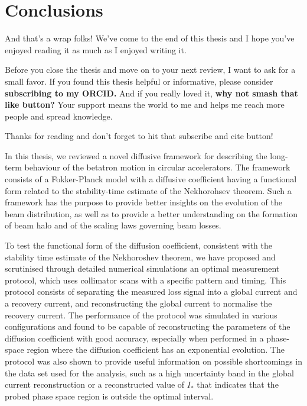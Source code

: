 \chapter*{Conclusions}

And that's a wrap folks! We've come to the end of this thesis and I hope you've enjoyed reading it as much as I enjoyed writing it.

Before you close the thesis and move on to your next review, I want to ask for a small favor. If you found this thesis helpful or informative, please consider \textbf{subscribing to my ORCID.} And if you really loved it, \textbf{why not smash that like button?} Your support means the world to me and helps me reach more people and spread knowledge.

Thanks for reading and don't forget to hit that subscribe and cite button!

In this thesis, we reviewed a novel diffusive framework for describing the long-term behaviour of the betatron motion in circular accelerators. The framework consists of a Fokker-Planck model with a diffusive coefficient having a functional form related to the stability-time estimate of the Nekhorohsev theorem. Such a framework has the purpose to provide better insights on the evolution of the beam distribution, as well as to provide a better understanding on the formation of beam halo and of the scaling laws governing beam losses.

To test the functional form of the diffusion coefficient, consistent with the stability time estimate of the Nekhoroshev theorem, we have proposed and scrutinised through detailed numerical simulations an optimal measurement protocol, which uses collimator scans with a specific pattern and timing. This protocol consists of separating the measured loss signal into a global current and a recovery current, and reconstructing the global current to normalise the recovery current. The performance of the protocol was simulated in various configurations and found to be capable of reconstructing the parameters of the diffusion coefficient with good accuracy, especially when performed in a phase-space region where the diffusion coefficient has an exponential evolution. The protocol was also shown to provide useful information on possible shortcomings in the data set used for the analysis, such as a high uncertainty band in the global current reconstruction or a reconstructed value of $I_\ast$ that indicates that the probed phase space region is outside the optimal interval.

